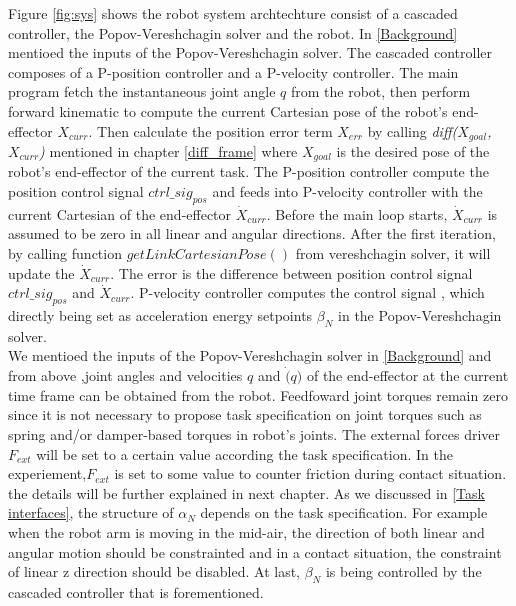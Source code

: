 \documentclass[report.tex]{subfiles}
\begin{document}
    Figure \ref{fig:sys} shows the robot system archtechture consist of a cascaded controller, the Popov-Vereshchagin solver and the robot. In \ref{Background} mentioed the inputs of the Popov-Vereshchagin solver. The cascaded controller composes of a P-position controller and a P-velocity controller. The main program fetch the instantaneous joint angle $q$ from the robot, then perform forward kinematic to compute the current Cartesian pose of the robot's end-effector $X_{curr}$. Then calculate the position error term $X_{err}$ by calling \textit{diff($X_{goal}$,$X_{curr}$)} mentioned in chapter \ref{diff_frame} where $X_{goal}$ is the desired pose of the robot's end-effector of the current task. The P-position controller compute the position control signal $ctrl\_sig_{pos}$ and feeds into P-velocity controller with the current Cartesian of the end-effector $\dot{X}_{curr}$. Before the main loop starts, $\dot{X}_{curr}$ is assumed to be zero in all linear and angular directions. After the first iteration, by calling function $getLinkCartesianPose()$ from vereshchagin solver, it will update the $\dot{X}_{curr}$. The error is the difference between position control signal $ctrl\_sig_{pos}$ and $\dot{X}_{curr}$. P-velocity controller computes the control signal , which directly being set as acceleration energy setpoints $\beta_N$ in the Popov-Vereshchagin solver.\\
    We mentioed the inputs of the Popov-Vereshchagin solver in \ref{Background} and from above ,joint angles and velocities $q$ and $\dot(q)$ of the end-effector at the current time frame can be obtained from the robot. Feedfoward joint torques remain zero since it is not necessary to propose task specification on joint torques such as spring and/or damper-based torques in robot's joints\cite{Vukcevic2020}. The external forces driver $F_{ext}$ will be set to a certain value according the task specification. In the experiement,$F_{ext}$ is set to some value to counter friction during contact situation. the details will be further explained in next chapter.
    As we discussed in \ref{Task interfaces}, the structure of $\alpha_N$ depends on the task specification. For example when the robot arm is moving in the mid-air, the direction of both linear and angular motion should be constrainted and in a contact situation, the constraint of linear z direction should be disabled. At last, $\beta_N$ is being controlled by the cascaded controller that is forementioned.
\end{document}
